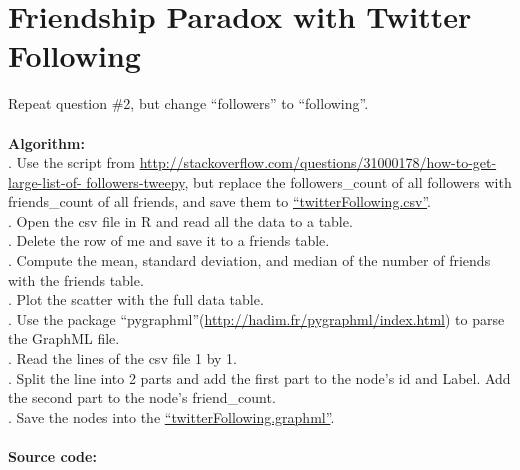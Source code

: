 \documentclass{article}
\begin{document}
		\section{Friendship Paradox with Twitter Following}Repeat question \#2, but change ``followers'' to ``following''.\\\\
		\textbf{Algorithm:}\\
		. Use the script from \url{http://stackoverflow.com/questions/31000178/how-to-get-large-list-of-
followers-tweepy}, but replace the followers\_count of all followers with friends\_count of all friends, and save them to \href{https://github.com/zhangboroy/cs532-s17/blob/master/assg04_submission/twitterFollowing.csv}{``twitterFollowing.csv''}.\\
		. Open the csv file in R and read all the data to a table.\\
		. Delete the row of me and save it to a friends table.\\
		. Compute the mean, standard deviation, and median of the number of friends with the friends table.\\
		. Plot the scatter with the full data table.\\
		. Use the package ``pygraphml''(\url{http://hadim.fr/pygraphml/index.html}) to parse the GraphML file.\\
		. Read the lines of the csv file 1 by 1.\\
		. Split the line into 2 parts and add the first part to the node's id and Label. Add the second part to the node's friend\_count.\\
		. Save the nodes into the \href{https://github.com/zhangboroy/cs532-s17/blob/master/assg04_submission/twitterFollowing.graphml}{``twitterFollowing.graphml''}.\\\\
		\textbf{Source code:}
		
		
		
\end{document}
